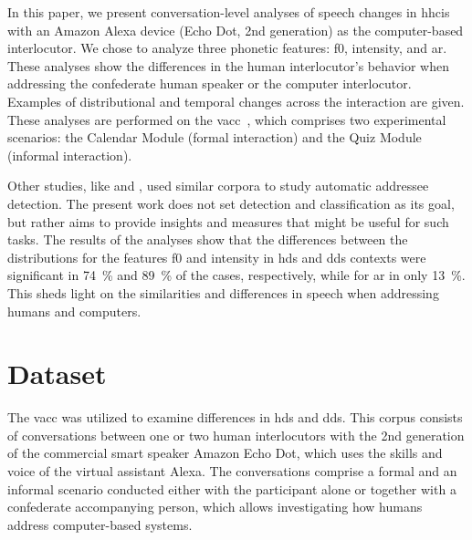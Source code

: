 In this paper, we present conversation-level analyses of speech changes in \acp{hhci} with an Amazon Alexa device (Echo Dot, 2nd generation) as the computer-based interlocutor.
We chose to analyze three phonetic features: \ac{f0}, intensity, and \ac{ar}.
These analyses show the differences in the human interlocutor's behavior when addressing the confederate human speaker or the computer interlocutor.
Examples of distributional and temporal changes across the interaction are given.
These analyses are performed on the \acf{vacc}~\citep{Siegert2018VACC}, which comprises two experimental scenarios: the Calendar Module (formal interaction) and the Quiz Module (informal interaction).

Other studies, like \citet{Shriberg2013addressee} and \citet{vanTurnhout2005identifying}, used similar corpora to study automatic addressee detection.
The present work does not set detection and classification as its goal, but rather aims to provide insights and measures that might be useful for such tasks.
The results of the analyses show that the differences between the distributions for the features \ac{f0} and intensity in \ac{hds} and \ac{dds} contexts were significant in \SI{74}{\percent} and \SI{89}{\percent} of the cases, respectively, while for \ac{ar} in only \SI{13}{\percent}.
This sheds light on the similarities and differences in speech when addressing humans and computers.

\section{Dataset}
\label{sec:dataset}

The \ac{vacc} \citep{Siegert2018VACC} was utilized to examine differences in \ac{hds} and \ac{dds}.
This corpus consists of conversations between one or two human interlocutors with the 2nd generation of the commercial smart speaker Amazon Echo Dot, which uses the skills and voice of the virtual assistant Alexa.
The conversations comprise a formal and an informal scenario conducted either with the participant alone or together with a confederate accompanying person, which allows investigating how humans address computer-based systems.


